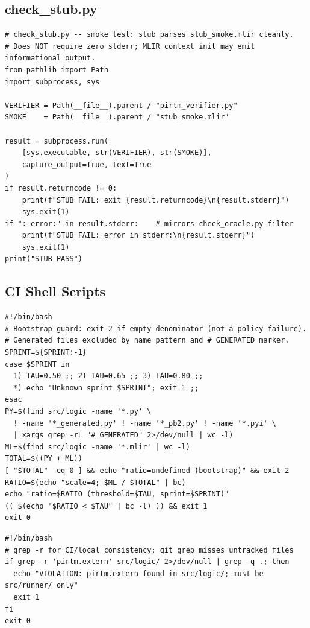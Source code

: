 \documentclass[11pt,letterpaper]{article}
\theoremstyle{pirtmthm}
\theoremstyle{remark}
\begin{document}
\subsection{check\_stub.py}

\begin{lstlisting}[style=python, caption={check\_stub.py --- Smoke test for verifier stub}]
# check_stub.py -- smoke test: stub parses stub_smoke.mlir cleanly.
# Does NOT require zero stderr; MLIR context init may emit informational output.
from pathlib import Path
import subprocess, sys

VERIFIER = Path(__file__).parent / "pirtm_verifier.py"
SMOKE    = Path(__file__).parent / "stub_smoke.mlir"

result = subprocess.run(
    [sys.executable, str(VERIFIER), str(SMOKE)],
    capture_output=True, text=True
)
if result.returncode != 0:
    print(f"STUB FAIL: exit {result.returncode}\n{result.stderr}")
    sys.exit(1)
if ": error:" in result.stderr:    # mirrors check_oracle.py filter
    print(f"STUB FAIL: error in stderr:\n{result.stderr}")
    sys.exit(1)
print("STUB PASS")
\end{lstlisting}

\subsection{CI Shell Scripts}

\begin{lstlisting}[style=bash,
  caption={measure\_ratio.sh --- Sprint ratio metric with bootstrap guard}]
#!/bin/bash
# Bootstrap guard: exit 2 if empty denominator (not a policy failure).
# Generated files excluded by name pattern and # GENERATED marker.
SPRINT=${SPRINT:-1}
case $SPRINT in
  1) TAU=0.50 ;; 2) TAU=0.65 ;; 3) TAU=0.80 ;;
  *) echo "Unknown sprint $SPRINT"; exit 1 ;;
esac
PY=$(find src/logic -name '*.py' \
  ! -name '*_generated.py' ! -name '*_pb2.py' ! -name '*.pyi' \
  | xargs grep -rL "# GENERATED" 2>/dev/null | wc -l)
ML=$(find src/logic -name '*.mlir' | wc -l)
TOTAL=$((PY + ML))
[ "$TOTAL" -eq 0 ] && echo "ratio=undefined (bootstrap)" && exit 2
RATIO=$(echo "scale=4; $ML / $TOTAL" | bc)
echo "ratio=$RATIO (threshold=$TAU, sprint=$SPRINT)"
(( $(echo "$RATIO < $TAU" | bc -l) )) && exit 1
exit 0
\end{lstlisting}

\begin{lstlisting}[style=bash,
  caption={check\_extern\_scope.sh --- Path-scope enforcement for pirtm.extern}]
#!/bin/bash
# grep -r for CI/local consistency; git grep misses untracked files
if grep -r 'pirtm.extern' src/logic/ 2>/dev/null | grep -q .; then
  echo "VIOLATION: pirtm.extern found in src/logic/; must be src/runner/ only"
  exit 1
fi
exit 0
\end{lstlisting}
\end{document}
